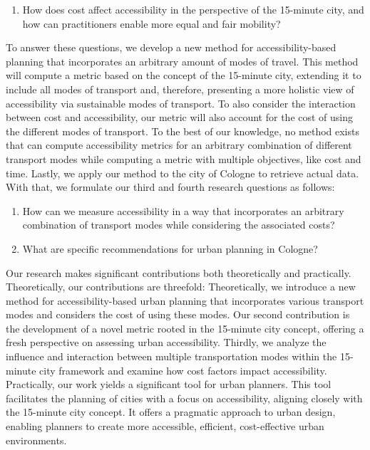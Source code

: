 \begin{enumerate}
  \renewcommand{\labelenumi}{RQ \theenumi.}
  \setcounter{enumi}{1}
  \item How does cost affect accessibility in the perspective of the 15-minute city, and how can practitioners enable more equal and fair mobility?
  \label{rq:cost_accessibility}
\end{enumerate}

To answer these questions, we develop a new method for accessibility-based planning that incorporates an arbitrary amount of modes of travel.
This method will compute a metric based on the concept of the 15-minute city, extending it to include all modes of transport and, therefore, presenting a more holistic view of accessibility via sustainable modes of transport.
To also consider the interaction between cost and accessibility, our metric will also account for the cost of using the different modes of transport.
To the best of our knowledge, no method exists that can compute accessibility metrics for an arbitrary combination of different transport modes while computing a metric with multiple objectives, like cost and time.
Lastly, we apply our method to the city of Cologne to retrieve actual data.
With that, we formulate our third and fourth research questions as follows:

\begin{enumerate}
  \renewcommand{\labelenumi}{RQ \theenumi.}
  \setcounter{enumi}{2}
  \item How can we measure accessibility in a way that incorporates an arbitrary combination of transport modes while considering the associated costs?
  \label{rq:measure_accessibility}
  \item What are specific recommendations for urban planning in Cologne?
  \label{rq:recommendations}
\end{enumerate}

Our research makes significant contributions both theoretically and practically. Theoretically, our contributions are threefold:
Theoretically, we introduce a new method for accessibility-based urban planning that incorporates various transport modes and considers the cost of using these modes.
Our second contribution is the development of a novel metric rooted in the 15-minute city concept, offering a fresh perspective on assessing urban accessibility.
Thirdly, we analyze the influence and interaction between multiple transportation modes within the 15-minute city framework and examine how cost factors impact accessibility.
Practically, our work yields a significant tool for urban planners. 
This tool facilitates the planning of cities with a focus on accessibility, aligning closely with the 15-minute city concept. 
It offers a pragmatic approach to urban design, enabling planners to create more accessible, efficient, cost-effective urban environments.

